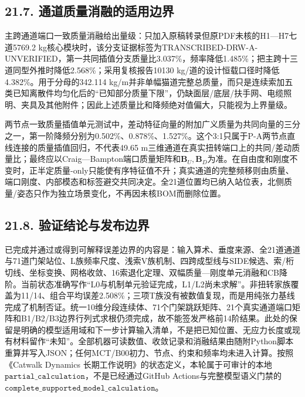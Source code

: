 \documentclass[UTF8,a4paper,11pt,fontset=none]{ctexart}
\begin{document}
\subsection*{21.7. 通道质量消融的适用边界}
主跨通道端口一致质量消融给出量级：只加入原稿转录但原PDF未核的H1—H7七道5769.2 kg核心模块时，该分支证据标签为TRANSCRIBED-DRW-A-UNVERIFIED，第一共同插值分支质量比3.037\%，频率降低1.485\%；把主跨十三道同型外推时降低2.568\%；采用复核报告10130 kg/道的设计恒载口径时降低4.382\%。用于分母的342.114 kg/m并非单幅猫道完整总质量，而只是连续索加五类已知离散件均匀化后的“已知部分质量下限”，仍缺面层/底层/扶手网、电缆照明、夹具及其他附件；因此上述质量比和降频绝对值偏大，只能视为上界量级。\par
两节点一致质量插值单元测试中，差动特征向量的附加广义质量为共同向量的三分之一，第一阶降频分别为0.502\%、0.878\%、1.527\%。这个3:1只属于P-A两节点直线连接的质量插值回归，不代表49.65 m三维通道在真实扭转端口上的共同/差动质量比；最终应以Craig—Bampton端口质量矩阵和\(\mathbf B_U,\allowbreak \mathbf B_D\)\allowbreak{}为准。在自由度和刚度不变时，正半定质量-only只能使有序特征值不升；真实通道的完整频移则由质量、端口刚度、内部模态和标签避交共同决定。全21道位置均已纳入站位表，北侧质量/姿态只作为独立场景变化，不再因未核BOM而删除位置。\par
{}
\subsection*{21.8. 验证结论与发布边界}
已完成并通过或得到可解释误差边界的内容是：输入算术、垂度来源、全21道通道与71道门架站位、L族频率尺度、浅索V族机制、四跨成型线与SIDE候选、索/桁切线、坐标变换、网格收敛、16索退化定理、双幅质量—刚度单元消融和CB降阶。当前状态准确写作“L0与机制单元验证完成，L1/L2尚未求解”。非扭转家族覆盖为11/14、组合平均误差2.508\%；三项T族没有被数值复现，而是用纯张力基线完成了机制否证。统一10维分段连续体、71个门架跳跃矩阵、21个真实通道端口矩阵和B1/B2/B3边界行列式求根仍须完成，故不能签发严格前14阶结果。此处的保留是明确的模型适用域和下一步计算输入清单，不是把已知位置、无应力长度或现有材料留作“未知”。全部机器可读数值、收敛记录和消融结果由随附Python脚本重算并写入JSON；任何MCT/B00初力、节点、约束和频率均未进入计算。按照《Catwalk Dynamics 长期工作说明》的状态定义，本轮属于可审计的本地\(\texttt{partial\_calculation}\)\allowbreak{}，不是已经通过GitHub Actions与完整模型语义门禁的\(\texttt{complete\_supported\_model\_calculation}\)\allowbreak{}。\par
{}
\end{document}
